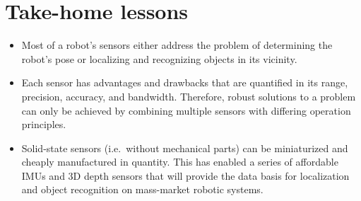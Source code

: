 \section*{Take-home lessons}
\begin{itemize}
\item Most of a robot's sensors either address the problem of determining the robot's pose or localizing and recognizing objects in its vicinity.
\item Each sensor has advantages and drawbacks that are quantified in its range, precision, accuracy, and bandwidth. Therefore, robust solutions to a problem can only be achieved by combining multiple sensors with differing operation principles.
\item Solid-state sensors (i.e.\ without mechanical parts) can be miniaturized and cheaply manufactured in quantity. This has enabled a series of affordable IMUs and 3D depth sensors that will provide the data basis for localization and object recognition on mass-market robotic systems.
\end{itemize}


